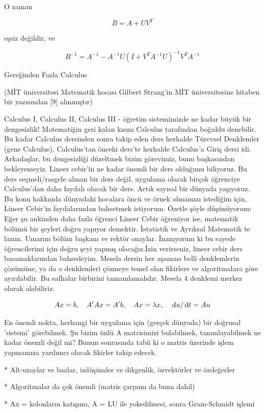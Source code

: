 \documentclass[12pt,fleqn]{article}\usepackage{../../common}
\begin{document}
O zaman 

$$B = A + UV^T$$

eşsiz değildir, ve 

$$
B^{-1} = A^{-1} - A^{-1} U ( I + V^T A^{-1} U)^{-1} V^T A^{-1} 
$$

\newpage

Gereğinden Fazla Calculus

(MİT üniversitesi Matematik hocası Gilbert Strang'in MİT üniversitesine hitaben
bir yazısından [9] alınmıştır)

Calculus I, Calculus II, Calculus III - öğretim sistemimizde ne kadar büyük bir
dengesizlik! Matematiğin geri kalan kısmı Calculus tarafından boğuldu
denebilir. Bu kadar Calculus dersinden sonra takip eden ders herhalde Türevsel
Denklemler (gene Calculus), Calculus'tan önceki ders'te herhalde Calculus'a
Giriş dersi idi. Arkadaşlar, bu dengesizliği düzeltmek bizim görevimiz, bunu
başkasından bekleyemeyiz. Lineer cebir'in ne kadar önemli bir ders olduğunu
biliyoruz. Bu ders seçmeli/rasgele alınan bir ders değil, uygulama olarak birçok
öğrenciye Calculus'dan daha faydalı olacak bir ders. Artık sayısal bir dünyada
yaşıyoruz. Bu konu hakkında dünyadaki hocalara öncü ve örnek olmamızı istediğim
için, Lineer Cebir'in faydalarından bahsetmek istiyorum. Özetle şöyle
düşünüyorum: Eğer şu ankinden daha fazla öğrenci Lineer Cebir öğreniyor ise,
matematik bölümü bir şeyleri doğru yapıyor demektir. İstatistik ve Ayrıksal
Matematik te lazım. Umarım bölüm başkanı ve rektör onaylar. İnanıyorum ki bu
sayede öğrencilerimi için doğru şeyi yapmış olacağız.İzin verirseniz, lineer
cebir ders basamaklarından bahsedeyim. Mesela dersin her aşaması belli
denklemlerin çözümüne, ya da o denklemleri çözmeye temel olan fikirlere ve
algoritmalara göre ayırılabilir. Bu safhalar birbirini tamamlamalıdır. Mesela 4
denklemi merkez olarak alabiliriz.

$$
Ax = b, \quad A'Ax = A'b, \quad Ax = \lambda x, \quad \,\mathrm{d} u / \,\mathrm{d} t = Au
$$

En önemli nokta, herhangi bir uygulama için (gerçek dünyada) bir doğrusal
'sistemi' görebilmek. Şu bizim ünlü A matrisimizi bulabilmek, tanımlayabilmek ne
kadar önemli değil mi? Bunun sonrasında tabii ki o matris üzerinde işlem
yapmamıza yardımcı olacak fikirler takip edecek.

* Alt-uzaylar ve bazlar, izdüşümler ve dikgenlik, özvektörler ve özdeğerler

* Algoritmalar da çok önemli (matris çarpımı da buna dahil)

* Ax = kolonların katışımı, A = LU ile yokedilmesi, sonra Gram-Schmidt işlemi
\end{document}
